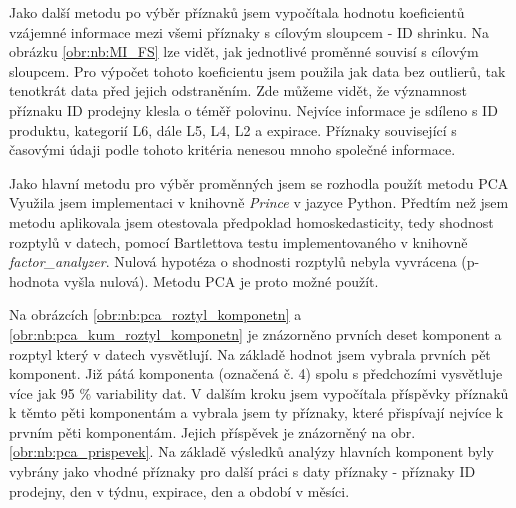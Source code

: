 Jako další metodu po výběr příznaků jsem vypočítala hodnotu koeficientů vzájemné informace mezi všemi příznaky s cílovým sloupcem - ID shrinku. Na obrázku \ref*{obr:nb:MI_FS} lze vidět, jak jednotlivé proměnné souvisí s cílovým sloupcem. Pro výpočet tohoto koeficientu jsem použila jak data bez outlierů, tak tenotkrát data před jejich odstraněním. Zde můžeme vidět, že významnost příznaku ID prodejny klesla o téměř polovinu. Nejvíce informace je sdíleno s ID produktu, kategorií L6, dále L5, L4, L2 a expirace. Příznaky související s časovými údaji podle tohoto kritéria nenesou mnoho společné informace.

Jako hlavní metodu pro výběr proměnných jsem se rozhodla použít metodu PCA 
Využila jsem implementaci v knihovně \emph{Prince} v jazyce Python. 
Předtím než jsem metodu aplikovala jsem otestovala předpoklad homoskedasticity, tedy shodnost rozptylů v datech, pomocí Bartlettova testu implementovaného v knihovně \emph{factor\_analyzer}. Nulová hypotéza o shodnosti rozptylů nebyla vyvrácena (p-hodnota vyšla nulová). Metodu PCA je proto možné použít.

Na obrázcích \ref*{obr:nb:pca_roztyl_komponetn} a \ref*{obr:nb:pca_kum_roztyl_komponetn} je znázorněno prvních deset komponent a rozptyl který v datech vysvětlují. Na základě hodnot jsem vybrala prvních pět komponent. Již pátá komponenta (označená č. 4) spolu s předchozími vysvětluje více jak 95 \% variability dat. V dalším kroku jsem vypočítala příspěvky příznaků k těmto pěti komponentám a vybrala jsem ty příznaky, které přispívají nejvíce k prvním pěti komponentám. Jejich příspěvek je znázorněný na obr. \ref*{obr:nb:pca_prispevek}. Na základě výsledků analýzy hlavních komponent byly vybrány jako vhodné příznaky pro další práci s daty příznaky - příznaky ID prodejny, den v týdnu, expirace, den a období v měsíci.

